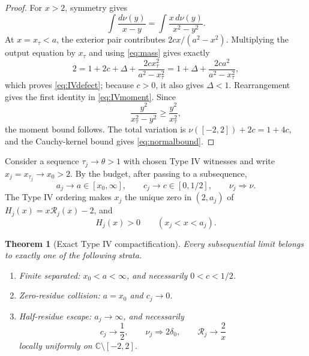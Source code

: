\documentclass[11pt,reqno]{amsart}
\newtheorem{theorem}{Theorem}[section]
\theoremstyle{definition}
\theoremstyle{remark}
\begin{document}
\begin{proof}
For $x>2$, symmetry gives
\[
 \int\frac{d\nu(y)}{x-y}
 =\int\frac{x\,d\nu(y)}{x^2-y^2}.
\]
At $x=x_\tau<a$, the exterior pair contributes
$2cx/(a^2-x^2)$.  Multiplying the output equation by $x_\tau$
and using \eqref{eq:mass} gives exactly
\[
 2=1+2c+\Delta+\frac{2cx_\tau^2}{a^2-x_\tau^2}
  =1+\Delta+\frac{2ca^2}{a^2-x_\tau^2},
\]
which proves \eqref{eq:IVdefect}; because $c>0$, it also gives
$\Delta<1$.  Rearrangement gives the first identity in
\eqref{eq:IVmoment}.  Since
\[
 \frac{y^2}{x_\tau^2-y^2}\ge\frac{y^2}{x_\tau^2},
\]
the moment bound follows.  The total variation is
$\nu([-2,2])+2c=1+4c$, and the Cauchy-kernel bound gives
\eqref{eq:normalbound}.
\end{proof}

Consider a sequence $\tau_j\to\theta>1$ with chosen Type IV witnesses and
write $x_j=x_{\tau_j}\to x_0>2$.  By the budget, after passing to a
subsequence,
\[
 a_j\to a\in[x_0,\infty],\qquad c_j\to c\in[0,1/2],\qquad
 \nu_j\Rightarrow\nu.
\]
The Type IV ordering makes $x_j$ the unique zero in $(2,a_j)$ of
$H_j(x)=x\mathcal R_j(x)-2$, and
\begin{equation}\label{eq:onesidedsign}
 H_j(x)>0\qquad(x_j<x<a_j).
\end{equation}

\begin{theorem}[Exact Type IV compactification]\label{thm:typeIVcompact}
Every subsequential limit belongs to exactly one of the following strata.
\begin{enumerate}[label=\textup{(\roman*)}]
\item \emph{Finite separated:} $x_0<a<\infty$, and necessarily
$0<c<1/2$.
\item \emph{Zero-residue collision:} $a=x_0$ and $c_j\to0$.
\item \emph{Half-residue escape:} $a_j\to\infty$, and necessarily
\begin{equation}\label{eq:escapelimit}
 c_j\to\frac12,\qquad \nu_j\Rightarrow2\delta_0,\qquad
 \mathcal R_j\longrightarrow\frac2x
\end{equation}
locally uniformly on $\mathbb C\setminus[-2,2]$.
\end{enumerate}
\end{theorem}
\end{document}
